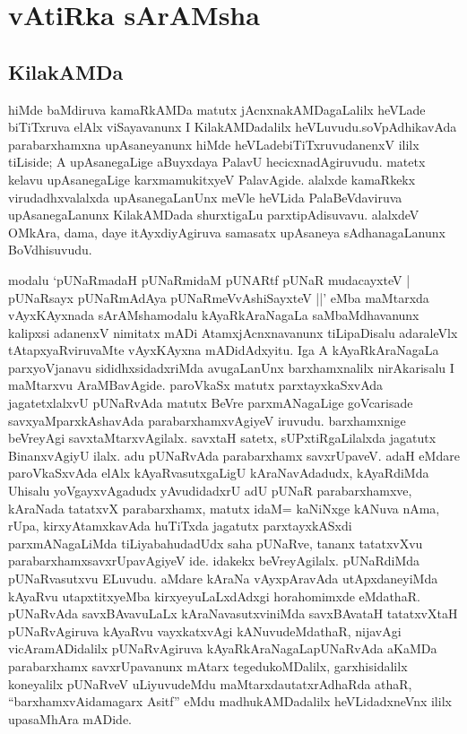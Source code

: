 \chapter{vAtiRka sArAMsha}


\section*{KilakAMDa}

\begin{artha}
hiMde baMdiruva kamaRkAMDa matutx jAcnxnakAMDagaLalilx heVLade biTiTxruva elAlx viSayavanunx I KilakAMDadalilx heVLuvudu.\break soVpAdhikavAda parabarxhamxna upAsaneyanunx hiMde heVLade\break biTiTxruvudanenxV ililx tiLiside; A upAsanegaLige aBuyxdaya PalavU hecicxnadAgiruvudu. matetx kelavu upAsanegaLige karxmamukitxyeV PalavAgide. alalxde kamaRkekx virudadhxvalalxda upAsanegaLanUnx meVle heVLida PalaBeVdaviruva upAsanegaLanunx KilakAMDada shurxtigaLu parxtipAdisuvavu. alalxdeV OMkAra, dama, daye itAyxdiyAgiruva samasatx upAsaneya sAdhanagaLanunx BoVdhisuvudu.
\end{artha}


\begin{artha}
modalu `pUNaRmadaH pUNaRmidaM pUNARtf pUNaR mudacayxteV |
pUNaRsayx pUNaRmAdAya pUNaRmeVvAshiSayxteV ||'
eMba maMtarxda vAyxKAyxnada sArAMsha\ndash  modalu kAyaRkAraNagaLa saMbaMdhavanunx kalipxsi adanenxV nimitatx mADi AtamxjAcnxnavanunx tiLipaDisalu adaraleVlx tAtapxyaRviruvaMte vAyxKAyxna mADidAdxyitu. Iga A kAyaRkAraNagaLa parxyoVjanavu sididhxsidadxriMda avugaLanUnx barxhamxnalilx nirAkarisalu I maMtarxvu AraMBavAgide. paroVkaSx matutx parxtayxkaSxvAda jagatetxlalxvU pUNaRvAda matutx BeVre parxmANagaLige goVcarisade savxyaMparxkAshavAda parabarxhamxvAgiyeV iruvudu. barxhamxnige beVreyAgi savxtaMtarxvAgilalx. savxtaH satetx, sUPxtiRgaLilalxda jagatutx BinanxvAgiyU ilalx. adu pUNaRvAda parabarxhamx savxrUpaveV. adaH eMdare paroVkaSxvAda elAlx kAyaRvasutxgaLigU kAraNavAdadudx, kAyaRdiMda Uhisalu yoVgayxvAgadudx yAvudidadxrU adU pUNaR parabarxhamxve, kAraNada tatatxvX parabarxhamx, matutx idaM= kaNiNxge kANuva nAma, rUpa, kirxyAtamxkavAda huTiTxda jagatutx parxtayxkASxdi parxmANagaLiMda tiLiyabahudadUdx saha pUNaRve, tananx tatatxvXvu parabarxhamxsavxrUpavAgiyeV ide. idakekx beVreyAgilalx. pUNaRdiMda pUNaRvasutxvu ELuvudu. aMdare kAraNa vAyxpAravAda utApxdaneyiMda kAyaRvu utapxtitxyeMba kirxyeyuLaLxdAdxgi horahomimxde eMdathaR. pUNaRvAda savxBAvavuLaLx kAraNavasutxviniMda savxBAvataH tatatxvXtaH pUNaRvAgiruva kAyaRvu vayxkatxvAgi kANuvudeMdathaR, nijavAgi vicAramADidalilx pUNaRvAgiruva kAyaRkAraNagaLa\break pUNaRvAda aKaMDa parabarxhamx savxrUpavanunx mAtarx tegedukoMDalilx, garxhisidalilx koneyalilx pUNaRveV uLiyuvudeMdu maMtarxda\break utatxrAdhaRda athaR, ``barxhamxvAidamagarx Asitf'' eMdu madhukAMDadalilx heVLidadxneVnx ililx upasaMhAra mADide.
\end{artha}

